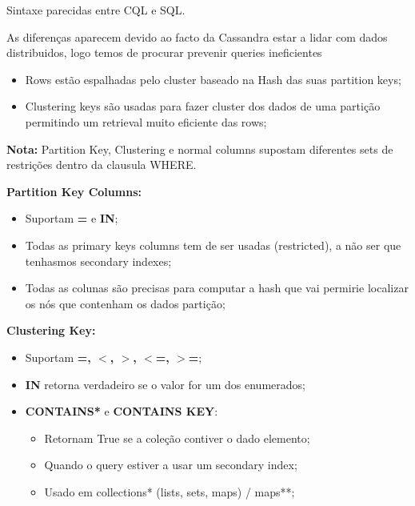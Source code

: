 \documentclass{article}
\begin{document}
\begin{flushleft}
  Sintaxe parecidas entre CQL e SQL.

  As diferenças aparecem devido ao facto da Cassandra estar a lidar com dados
  distribuidos, logo temos de procurar prevenir queries ineficientes
  \begin{itemize}
    \item Rows estão espalhadas pelo cluster baseado na Hash das suas partition keys;
    \item Clustering keys são usadas para fazer cluster dos dados de uma partição
    permitindo um retrieval muito eficiente das rows;
  \end{itemize}

  \vspace{2mm}

  \textbf{Nota:} Partition Key, Clustering e normal columns supostam diferentes
  sets de restrições dentro da clausula WHERE.

  \vspace{2mm}

  \textbf{Partition Key Columns:}
  \begin{itemize}
    \item Suportam \textbf{=} e \textbf{IN};
    \item Todas as primary keys columns tem de ser usadas (restricted),
    a não ser que tenhasmos secondary indexes;
    \item Todas as colunas são precisas para computar a hash que vai permirie localizar
    os nós que contenham os dados partição;
  \end{itemize}

  \vspace{2mm}

  \textbf{Clustering Key:}
  \begin{itemize}
    \item Suportam \textbf{=, $<$, $>$, $<$=, $>$=};
    \item \textbf{IN} retorna verdadeiro se o valor for um dos enumerados;
    \item \textbf{CONTAINS*} e \textbf{CONTAINS KEY}:
    \begin{itemize}
      \item Retornam True se a coleção contiver o dado elemento;
      \item Quando o query estiver a usar um secondary index;
      \item Usado em collections* (lists, sets, maps) / maps**; 
    \end{itemize}
  \end{itemize}
\end{flushleft}
\end{document}
